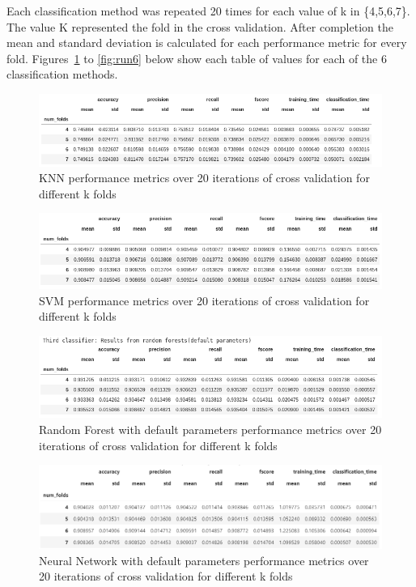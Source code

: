 Each classification method was repeated 20 times for each value of k in \{4,5,6,7\}. The value K represented the fold in the cross validation. After completion the mean and standard deviation is calculated for each performance metric for every fold. Figures~\ref{fig:run1} to \ref{fig:run6} below show each table of values for each of the 6 classification methods.


\begin{figure}[!ht]
 \centering
\includegraphics[width=\textwidth]{assignment2/2-4-run1.png}
\caption{\label{fig:run1} KNN performance metrics over 20 iterations of cross validation for different k folds}
\end{figure}

\begin{figure}[!ht]
 \centering
\includegraphics[width=\textwidth]{assignment2/2-4-run2.png}
\caption{\label{fig:run2} SVM performance metrics over 20 iterations of cross validation for different k folds}
\end{figure}

\begin{figure}[!ht]
 \centering
\includegraphics[width=\textwidth]{assignment2/2-4-run3.png}
\caption{\label{fig:run3} Random Forest with default parameters performance metrics over 20 iterations of cross validation for different k folds}
\end{figure}

\begin{figure}[!ht]
 \centering
\includegraphics[width=\textwidth]{assignment2/2-4-run4.png}
\caption{\label{fig:run4} Neural Network with default parameters performance metrics over 20 iterations of cross validation for different k folds}
\end{figure}

